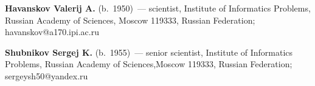 \vspace*{3pt}

\noindent
\textbf{Havanskov Valerij A.} (b.\ 1950)~--- scientist, Institute of Informatics Problems, 
Russian Academy of Sciences,
Moscow 119333,
Russian Federation; havanskov@a170.ipi.ac.ru

\vspace*{3pt}

\noindent
\textbf{Shubnikov Sergej K.} (b.\ 1955)~--- senior scientist, Institute of Informatics 
Problems, Russian Academy of Sciences,Moscow 119333,
Russian Federation; sergeysh50@yandex.ru

 \label{end\stat}
 
\renewcommand{\bibname}{\protect\rm Литература}
      